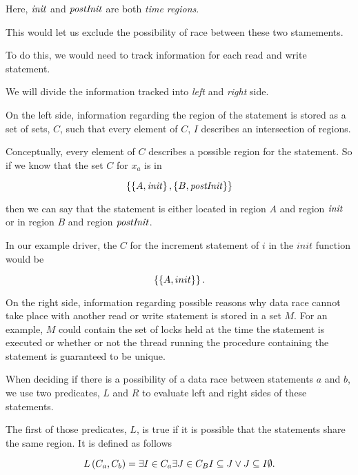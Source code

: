 \documentclass[..thesis.tex]{subfiles}
\begin{document}
Here, $\mathit{init}$ and $\mathit{postInit}$ are both \textit{time regions}.

This would let us exclude the possibility of race between these two stamements. 


To do this, we would need to track information for each read and write statement.

We will divide the information tracked into \textit{left} and \textit{right} side. 

On the left side, information regarding the region of the statement is stored as a set of sets, $C$,
such that every element of $C$, $I$ describes an intersection of regions.

Conceptually, every element of $C$ describes a possible region for the statement. So if we know that the set $C$ for $x_{a}$ is in
   
\begin{equation*}
\left\lbrace \left\lbrace A, \mathit{init} \right\rbrace, \left\lbrace B, \mathit{postInit} \right\rbrace \right\rbrace 
\end{equation*}

then we can say that the statement is either located in region $A$ and region $\mathit{init}$ or in region $B$ and region $\mathit{postInit}$. 

In our example driver, the $C$ for the increment statement of $i$ in the $init$ function would be 

\begin{equation*}
\left\lbrace \left\lbrace A, init \right\rbrace \right\rbrace \text{.}
\end{equation*} 

On the right side, information regarding possible reasons why data race cannot take place with another read or write statement is stored in a set $M$.
For an example, $M$ could contain the set of locks held at the time the statement is executed or whether or not the thread running the procedure containing the statement is guaranteed to be unique.

When deciding if there is a possibility of a data race between statements $a$ and $b$, we use two predicates, $L$ and $R$ to evaluate left and right sides of these statements. 


The first of those predicates, $L$, is true if it is possible that the statements share the same region. It is defined as follows

\begin{equation*}
L \left( C_a, C_b \right) = \exists I \in C_a \exists J \in C_B  I \subseteq J \lor J \subseteq I \emptyset \text{.}
\end{equation*}
\end{document}

